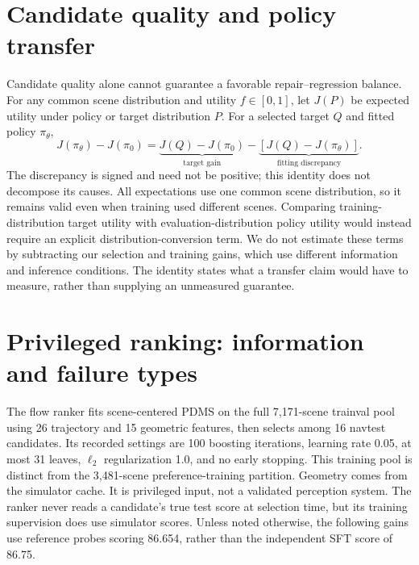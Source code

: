 \documentclass[10pt,letterpaper]{article}
\begin{document}
\FloatBarrier
\section{Candidate quality and policy transfer}
Candidate quality alone cannot guarantee a favorable repair--regression balance. For any common scene distribution and utility $f\in[0,1]$, let $J(P)$ be expected utility under policy or target distribution $P$. For a selected target $Q$ and fitted policy $\pi_\theta$,
\begin{equation}
J(\pi_\theta)-J(\pi_0)=
\underbrace{J(Q)-J(\pi_0)}_{\text{target gain}}-
\underbrace{[J(Q)-J(\pi_\theta)]}_{\text{fitting discrepancy}}.
\label{eq:transfer}
\end{equation}
The discrepancy is signed and need not be positive; this identity does not decompose its causes. All expectations use one common scene distribution, so it remains valid even when training used different scenes. Comparing training-distribution target utility with evaluation-distribution policy utility would instead require an explicit distribution-conversion term. We do not estimate these terms by subtracting our selection and training gains, which use different information and inference conditions. The identity states what a transfer claim would have to measure, rather than supplying an unmeasured guarantee.


\FloatBarrier
\section{Privileged ranking: information and failure types}
The flow ranker fits scene-centered PDMS on the full 7,171-scene trainval pool using 26 trajectory and 15 geometric features, then selects among 16 navtest candidates. Its recorded settings are 100 boosting iterations, learning rate 0.05, at most 31 leaves, $\ell_2$ regularization 1.0, and no early stopping. This training pool is distinct from the 3,481-scene preference-training partition. Geometry comes from the simulator cache. It is privileged input, not a validated perception system. The ranker never reads a candidate's true test score at selection time, but its training supervision does use simulator scores. Unless noted otherwise, the following gains use reference probes scoring 86.654, rather than the independent SFT score of 86.75.
\end{document}
